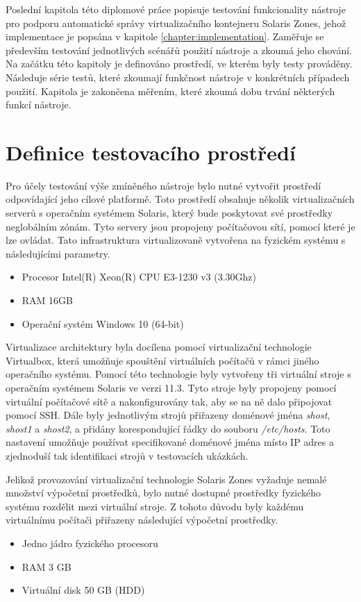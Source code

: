 \label{chapter:testing}
Poslední kapitola této diplomové práce popisuje testování funkcionality nástroje pro podporu automatické správy virtualizačního
kontejneru Solaris Zones, jehož implementace je popsána v kapitole \ref{chapter:implementation}. Zaměřuje se především testování
jednotlivých scénářů použití nástroje a zkoumá jeho chování. Na začátku této kapitoly je definováno prostředí, ve kterém byly
testy prováděny. Následuje série testů, které zkoumají funkčnost nástroje v konkrétních případech použití. Kapitola je zakončena
měřením, které zkoumá dobu trvání některých funkcí nástroje.
\section{Definice testovacího prostředí}
\label{chapter:testing:environment}
Pro účely testování výše zmíněného nástroje bylo nutné vytvořit prostředí odpovídající jeho cílové platformě. Toto prostředí
obsahuje několik virtualizačních serverů s operačním systémem Solaris, který bude poskytovat své prostředky neglobálním zónám.
Tyto servery jsou propojeny počítačovou sítí, pomocí které je lze ovládat. Tato infrastruktura virtualizovaně vytvořena na 
fyzickém systému s následujícími parametry.
\begin{itemize}
 \item Procesor Intel(R) Xeon(R) CPU E3-1230 v3 (3.30Ghz)
 \item RAM 16GB
 \item Operační systém Windows 10 (64-bit)
\end{itemize}
Virtualizace architektury byla docílena pomocí virtualizační technologie Virtualbox, která umožňuje spouštění virtuálních 
počítačů v rámci jiného operačního systému. Pomocí této technologie byly vytvořeny tři virtuální stroje s operačním systémem
Solaris ve verzi 11.3. Tyto stroje byly propojeny pomocí virtuální počítačové sítě a nakonfigurovány tak, aby se na ně dalo 
připojovat pomocí SSH. Dále byly jednotlivým strojů přiřazeny doménové jména \textit{shost}, \textit{shost1} a \textit{shost2},
a přidány korespondující řádky do souboru \textit{/etc/hosts}. Toto nastavení umožňuje používat specifikované doménové jména
místo IP adres a zjednoduší tak identifikaci strojů v testovacích ukázkách. 

Jelikož provozování virtualizační technologie Solaris Zones vyžaduje nemalé množství výpočetní prostředků, bylo nutné
dostupné prostředky fyzického systému rozdělit mezi virtuální stroje. Z tohoto důvodu byly každému virtuálnímu počítači
přiřazeny následující výpočetní prostředky.
\begin{itemize}
 \item Jedno jádro fyzického procesoru
 \item RAM 3 GB 
 \item Virtuální disk 50 GB (HDD)
\end{itemize}

